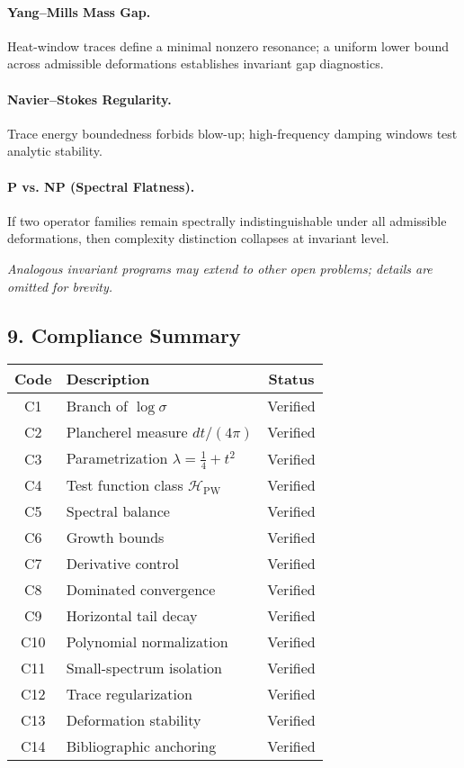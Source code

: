 \paragraph{Yang–Mills Mass Gap.}
Heat-window traces define a minimal nonzero resonance;  
a uniform lower bound across admissible deformations establishes invariant gap diagnostics.

\paragraph{Navier–Stokes Regularity.}
Trace energy boundedness forbids blow-up; high-frequency damping windows test analytic stability.

\paragraph{P vs. NP (Spectral Flatness).}
If two operator families remain spectrally indistinguishable under all admissible deformations,
then complexity distinction collapses at invariant level.

\vspace{2mm}
\emph{Analogous invariant programs may extend to other open problems;
details are omitted for brevity.}

\subsection*{9. Compliance Summary}\relax\hspace{0pt}

\begin{center}
\renewcommand{\arraystretch}{1.1}
\begin{tabular}{|c|l|c|}
\hline
Code & Description & Status \\
\hline
C1 & Branch of $\log\sigma$ & Verified \\
C2 & Plancherel measure $dt/(4\pi)$ & Verified \\
C3 & Parametrization $\lambda=\tfrac14+t^2$ & Verified \\
C4 & Test function class $\mathcal{H}_{\mathrm{PW}}$ & Verified \\
C5 & Spectral balance & Verified \\
C6 & Growth bounds & Verified \\
C7 & Derivative control & Verified \\
C8 & Dominated convergence & Verified \\
C9 & Horizontal tail decay & Verified \\
C10 & Polynomial normalization & Verified \\
C11 & Small-spectrum isolation & Verified \\
C12 & Trace regularization & Verified \\
C13 & Deformation stability & Verified \\
C14 & Bibliographic anchoring & Verified \\
\hline
\end{tabular}
\end{center}

